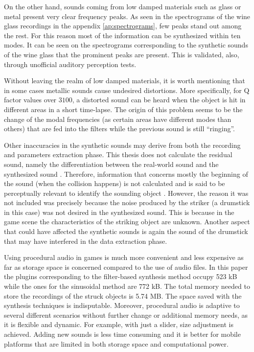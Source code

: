 On the other hand, sounds coming from low damped materials such as glass or metal present very clear frequency peaks. As seen in the spectrograms of the wine glass recordings in the appendix \ref{ap:spectrograms}, few peaks stand out among the rest. For this reason most of the information can be synthesized within ten modes. It can be seen on the spectrograms corresponding to the synthetic sounds of the wine glass that the prominent peaks are present. This is validated, also, through unofficial auditory perception tests. 

Without leaving the realm of low damped materials, it is worth mentioning that in some cases metallic sounds cause undesired distortions. More specifically, for \gls{Q} factor values over $3100$, a distorted sound can be heard when the object is hit in different areas  in a short time-lapse. The origin of this problem seems to be the change of the modal frequencies (as certain areas have different modes than others) that are fed into the filters while the previous sound is still ``ringing''. 


Other inaccuracies in the synthetic sounds may derive from both the recording and parameters extraction phase. This thesis does not calculate the residual sound, namely the differentiation between the real-world sound and the synthesized sound \cite{ren2013example}. Therefore, information that concerns mostly the beginning of the sound (when the collision happens) is not calculated and is said to be perceptually relevant to identify the sounding object \cite{freed1990auditory}. However, the reason it was not included was precisely because the noise produced by the striker (a drumstick in this case) was not desired in the synthesized sound. This is because in the game scene the characteristics of the striking object are unknown. Another aspect that could have affected the synthetic sounds is again the sound of the drumstick that may have interfered in the data extraction phase.

Using procedural audio in games is much more convenient and less expensive as far as storage space is concerned compared to the use of audio files. In this paper the plugins corresponding to the filter-based synthesis method occupy 523 kB while the ones for the sinusoidal method are 772 kB. The total memory needed to store the recordings of the struck objects is 5.74 MB. The space saved with the synthesis techniques is indisputable. Moreover, procedural audio is adaptive to several different scenarios without further change or additional memory needs, as it is flexible and dynamic. For example, with just a slider, size adjustment is achieved.  Adding new sounds is less time consuming and it is better for mobile platforms that are limited in both storage space and computational power.

